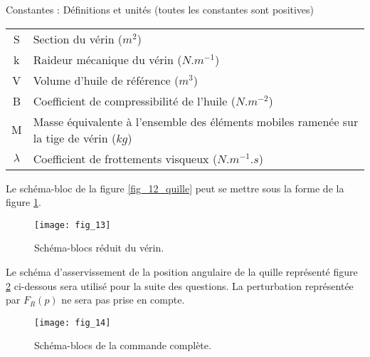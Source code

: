 \begin{center}
Constantes : Définitions et unités (toutes les constantes sont positives)
\begin{tabular}{cp{12cm}}
\hline
S & 	Section du vérin ($\si{m^2}$) \\
k & 	Raideur mécanique du vérin ($\si{N.m^{-1}}$) \\
V & 	Volume d’huile de référence ($\si{m^3}$) \\		
B &	Coefficient de compressibilité de l’huile ($\si{N.m^{-2}}$)\\
M &	Masse équivalente à l’ensemble des éléments mobiles ramenée sur la tige de vérin ($\si{kg}$) \\
$\lambda$  & Coefficient de frottements visqueux ($\si{N.m^{-1}.s}$) \\
\hline
\end{tabular}
\end{center}




Le schéma-bloc de la figure \ref{fig_12_quille} peut se mettre sous la forme de la figure \ref{fig_13_quille}.



\begin{figure}[!h]
\centering
\texttt{[image: fig\_13]}
\caption{Schéma-blocs réduit du vérin. \label{fig_13_quille}}
\end{figure}



Le schéma d’asservissement de la position angulaire de la quille représenté figure \ref{fig_14_quille} ci-dessous sera utilisé pour la suite des questions. La perturbation représentée par $F_R(p)$ ne sera pas prise en compte.

\begin{figure}[!h]
\centering
\texttt{[image: fig\_14]}
\caption{Schéma-blocs de la commande complète. \label{fig_14_quille}}
\end{figure}


